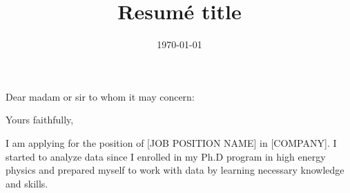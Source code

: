 \documentclass[11pt,letterpaper]{moderncv}   %
\title{Resumé title}                               %
\begin{document}
%
%

\date{\today}

\opening{Dear madam or sir to whom it may concern:}
\closing{Yours faithfully,} %

\makelettertitle

%
%
%
%

\justifying
I am applying for the position of [JOB POSITION NAME] in [COMPANY]. I started to analyze data since I enrolled in my Ph.D program in high energy physics and prepared myself to work with data by learning necessary knowledge and skills.


\end{document}
